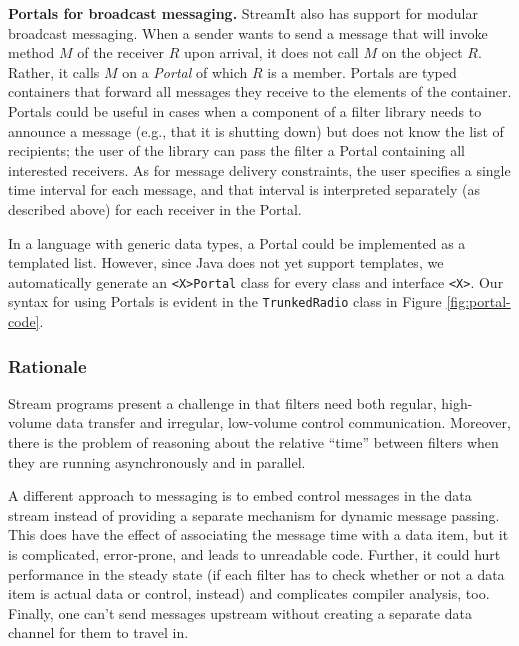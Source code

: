 %
{\bf Portals for broadcast messaging.}  StreamIt also has support for
modular broadcast messaging.  When a sender wants to send a message
that will invoke method $M$ of the receiver $R$ upon arrival, it does
not call $M$ on the object $R$.  Rather, it calls $M$ on a {\it
Portal} of which $R$ is a member.  Portals are typed containers that
forward all messages they receive to the elements of the container.
Portals could be useful in cases when a component of a filter library
needs to announce a message (e.g., that it is shutting down) but does
not know the list of recipients; the user of the library can pass the
filter a Portal containing all interested receivers.  As for message
delivery constraints, the user specifies a single time interval for
each message, and that interval is interpreted separately (as
described above) for each receiver in the Portal.

In a language with generic data types, a Portal could be implemented
as a templated list.  However, since Java does not yet support
templates, we automatically generate an {\tt <X>Portal} class for
every class and interface {\tt <X>}.  Our syntax for using Portals is
evident in the {\tt TrunkedRadio} class in Figure
\ref{fig:portal-code}.

\subsubsection{Rationale}

Stream programs present a challenge in that filters need both regular,
high-volume data transfer and irregular, low-volume control
communication.  Moreover, there is the problem of reasoning about the
relative ``time'' between filters when they are running asynchronously
and in parallel.

A different approach to messaging is to embed control messages in the
data stream instead of providing a separate mechanism for dynamic
message passing.  This does have the effect of associating the message
time with a data item, but it is complicated, error-prone, and leads
to unreadable code.  Further, it could hurt performance in the steady
state (if each filter has to check whether or not a data item is
actual data or control, instead) and complicates compiler analysis,
too.  Finally, one can't send messages upstream without creating a
separate data channel for them to travel in.

